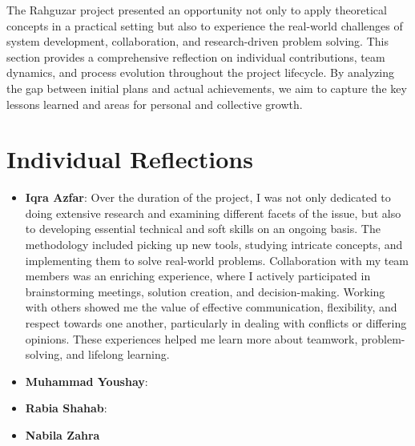 The Rahguzar project presented an opportunity not only to apply theoretical concepts in a practical setting but also to experience the real-world challenges of system development, collaboration, and research-driven problem solving. This section provides a comprehensive reflection on individual contributions, team dynamics, and process evolution throughout the project lifecycle. By analyzing the gap between initial plans and actual achievements, we aim to capture the key lessons learned and areas for personal and collective growth.

\section{Individual Reflections}

\begin{itemize}
    \item \textbf{Iqra Azfar}: Over the duration of the project, I was not only dedicated to doing extensive research and examining different facets of the issue, but also to developing essential technical and soft skills on an ongoing basis. The methodology included picking up new tools, studying intricate concepts, and implementing them to solve real-world problems. Collaboration with my team members was an enriching experience, where I actively participated in brainstorming meetings, solution creation, and decision-making. Working with others showed me the value of effective communication, flexibility, and respect towards one another, particularly in dealing with conflicts or differing opinions. These experiences helped me learn more about teamwork, problem-solving, and lifelong learning.
    \item \textbf{Muhammad Youshay}:
    \item \textbf{Rabia Shahab}:
    \item \textbf{Nabila Zahra}
\end{itemize}

